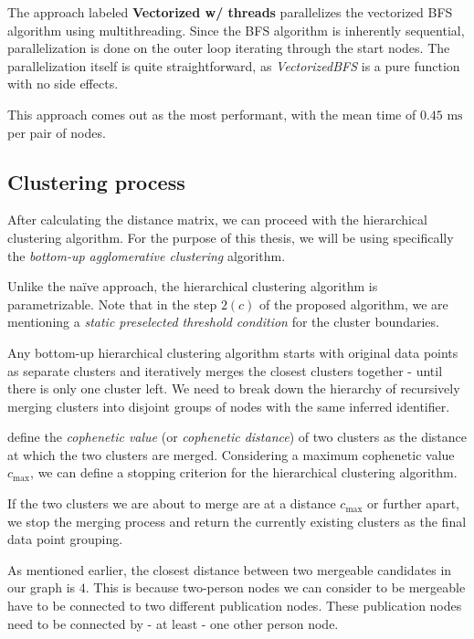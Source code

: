 The approach labeled \textbf{Vectorized w/ threads} parallelizes the vectorized BFS algorithm using multithreading.
Since the BFS algorithm is inherently sequential, parallelization is done on the outer loop iterating through the start nodes.
The parallelization itself is quite straightforward, as \textit{VectorizedBFS} is a pure function with no side effects.

This approach comes out as the most performant, with the mean time of $0.45\text{ ms}$ per pair of nodes.

\subsection{Clustering process}\label{sec:clustering-process}

After calculating the distance matrix, we can proceed with the hierarchical clustering algorithm.
For the purpose of this thesis, we will be using specifically the \textit{bottom-up agglomerative clustering} algorithm.

Unlike the naïve approach, the hierarchical clustering algorithm is parametrizable. Note that in the step $2(c)$ of the proposed algorithm, 
we are mentioning a \textit{static preselected threshold condition} for the cluster boundaries.

Any bottom-up hierarchical clustering algorithm starts with original data points as separate clusters and iteratively merges the closest clusters together - until there is only one cluster left.
We need to break down the hierarchy of recursively merging clusters into disjoint groups of nodes with the same inferred identifier.

\cite{cophenetic} define the \textit{cophenetic value} (or \textit{cophenetic distance}) of two clusters as the distance at which the two clusters are merged.
Considering a maximum cophenetic value $c_{\text{max}}$, we can define a stopping criterion for the hierarchical clustering algorithm.

If the two clusters we are about to merge are at a distance $c_{\text{max}}$ or further apart, we stop the merging process and 
return the currently existing clusters as the final data point grouping.

As mentioned earlier, the closest distance between two mergeable candidates in our graph is $4$. 
This is because two-person nodes we can consider to be mergeable have to be connected to two different publication nodes.
These publication nodes need to be connected by - at least - one other person node.

